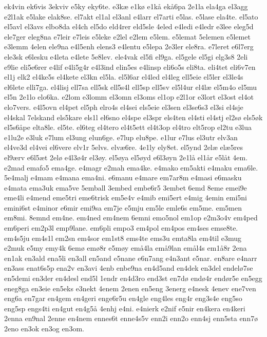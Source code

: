 {ek4vin
ek6vis
3ekviv
e5ky
eky6te.
e3k^^e6
e1k^^f8
e1k^^e5
ek^^e56pa
2e1la
ela4ga
el3agg
e2l1ak
e5lake
elak8se.
el7akt
el1al
el3anl
e4larr
el7arti
e5las.
e5lase
ela4te.
el5ato
el5avl
el3avs
elbo8da
el4ch
el5do
eld4rer
eld5sle
4eled
e4ledi
e4ledr
e3lee
eleg5d
ele7ger
eleg8na
e7leir
e7leis
e5leke
e2lel
e2lem
e5lem.
e5lemat
5elemen
e5lemet
e3lemm
4elen
ele9na
e4l5enh
elens3
e4lentu
e5lepa
2e3ler
ele8ra.
e7leret
e6l7erg
ele3sk
e6lesku
e4leta
e4lete
5e8lev.
ele4vak
el5fi
el9ga.
el5gele
el5gi
elg3s8
2eli
e9lie
eli5e6rer
e4lif
e4li5g4r
e4l3ind
elin5es
e4linsp
eli6o5s
eli8ta.
eli4tet
eli6v7en
el1j
elk2
el4ke5s
el4kete
el3kn
el5la.
el5l6ar
el4led
el4leg
ell5eie
el5ler
el3le4s
el6lete
elli7ga.
el4lisj
ell7sa
ell5sk
ell5s4l
ell5sp
ell5sv
el5l4ur
el4l^^e6
el5m4o
el5mu
el5n
2e1lo
elo6ka.
e2lom
e3lomm
el3omn
el3oms
el1op
e2l1or
e3lort
el3ost
el4ot
elo7vers.
e4l5ovn
el4pet
el5ph
elro4s
el4sei
els5eie
el3sen
el3se6s3
el3si
el4sje
el4skal
7elskand
els5kare
els1l
el6sno
el4spe
el3spr
els4ten
el4sti
el4stj
el2s^^f8
els5^^f8k
el5s6^^e5pe
elta8le.
el5te.
el6teg
el4tero
el4t5ett
el4t3op
el4tro
elt5rop
el2tu
e3lua
e1lu2e
e3luk
e7lum
el3ung
elun6ge.
e7lup
elu8pe.
e1lur
e7lus
el3utr
elv3an
el4ve3d
el4vei
el6vere
elv1r
5elvs.
elv^^e66re.
4e1ly
ely8et.
el5ynd
2el^^e6
el^^e65res
el9^^e6rv
e6l5^^e6t
2el^^f8
e4l3^^f84r
el3^^f8y.
el5^^f8ya
el5^^f8yd
e6l3^^f8yn
2e1l^^e5
el1^^e5r
e5l^^e5t
4em.
e2mad
emafo5
ema4ge.
e4magr
e2mah
ema4ke.
e4mako
em5akti
e4maku
ema6le.
5e4malj
e4mam
e4mana
ema4ni.
e6manu
e4mare
em7ar8m
e4masi
e6masku
e4mata
ema3uk
ema5ve
5emball
3embed
embe6r5
3embet
6emd
8eme
emei9e
eme4li
e4mend
eme5tri
eme6trisk
em5e4v
e4mib
emi5ert
e4mig
4emin
emi5ni
emini6st
e4minor
e6mir
emi9sa
em7je
e5mju
em5le
emle6s
em5me.
em5men
em8mi.
8emnd
em4ne.
em4ned
em4nem
6emni
emo5nol
em1op
e2m3o4v
em4ped
em6peri
em2p3l
emp9lane.
em6pli
empo3
em4pol
em4pos
em4ses
emse8te.
em4s5ju
em4s1l
em2sn
em4sor
em1st8
ems4te
ems3u
emta8la
em4til
e3mug
e2muk
e5my
emy4k
6em^^f8
em^^f88r
e5m^^f8y
em^^e54la
em^^e59lan
em^^e5l4s
em1^^e58r
2ena
en1ak
en3ald
ena5li
en3all
en5and
e5nane
e6n7ang
e4n3ant
e5nar.
en8are
e4narr
en3ass
enat6s5p
ena2v
en3avi
4enb
enbe9na
en4d5and
en4dek
en3del
endel^^f87se
en5demi
en3der
en4desl
end5l
1endr
en4d3ro
end3st
en7d^^f8
end^^f84r
end^^f8r5e
en5egg
eneg8ga
en3eie
en5eks
e3nekt
4enem
2enen
en5eng
3energ
e4nesk
4enev
ene7ven
eng6a
en7gar
en4gem
en4geri
enge6r5u
en4gle
eng4les
eng4r
eng3s4e
eng5so
eng5sp
engs4ti
en4gut
en4g5^^e5
4enhj
e4ni.
e4nierk
e2nif
e5nir
en4kera
en4keri
2enna
en9nal
2enne
en4nem
ennes6t
enne4s5v
enn2i
enn2o
enn4sj
enn5sta
enn7^^f8
2eno
en3ok
en3og
en3om.
}
